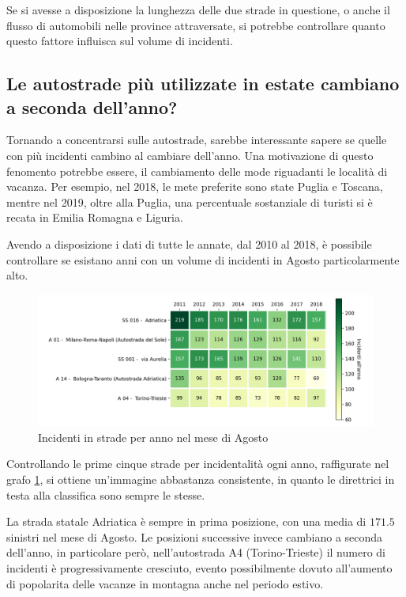 \documentclass[a4paper,12pt]{report}
\begin{document}
Se si avesse a disposizione la lunghezza delle due strade in questione, 
o anche il flusso di automobili nelle province attraversate, 
si potrebbe controllare quanto questo fattore influisca sul volume di incidenti. 

\subsection{Le autostrade più utilizzate in estate cambiano a seconda dell'anno?}

Tornando a concentrarsi sulle autostrade, sarebbe interessante sapere se quelle 
con più incidenti cambino al cambiare dell'anno.
Una motivazione di questo fenomento potrebbe essere, il cambiamento 
delle mode riguadanti le località di vacanza.
Per esempio, nel 2018, le mete preferite sono state Puglia e 
Toscana\cite{INFOGRAFICA_ISTAT:1}, mentre nel 2019, oltre alla Puglia, 
una percentuale sostanziale di turisti si è recata in 
Emilia Romagna e Liguria\cite{REPORT_ISTAT_2019:1}.

Avendo a disposizione i dati di tutte le annate, dal 2010 al 2018, 
è possibile controllare se esistano anni con un volume di 
incidenti in Agosto particolarmente alto.

\begin{figure}
    \includegraphics[width=\linewidth]{../src/incidenti/incidenti_aci/agosto/vacanze_autostrade.png}
    \caption{Incidenti in strade per anno nel mese di Agosto}
    \label{fig:autostrade-anno}
\end{figure}

Controllando le prime cinque strade per incidentalità ogni anno, 
raffigurate nel grafo \ref{fig:autostrade-anno}, si ottiene un'immagine 
abbastanza consistente, in quanto le direttrici in testa alla classifica sono 
sempre le stesse.

La strada statale Adriatica è sempre in prima posizione, con una media di $171.5$ 
sinistri nel mese di Agosto.
Le posizioni successive invece cambiano a seconda dell'anno, in particolare però, 
nell'autostrada A4 (Torino-Trieste) il numero di incidenti è progressivamente cresciuto, 
evento possibilmente dovuto all'aumento di popolarita delle vacanze 
in montagna anche nel periodo estivo.
\end{document}
